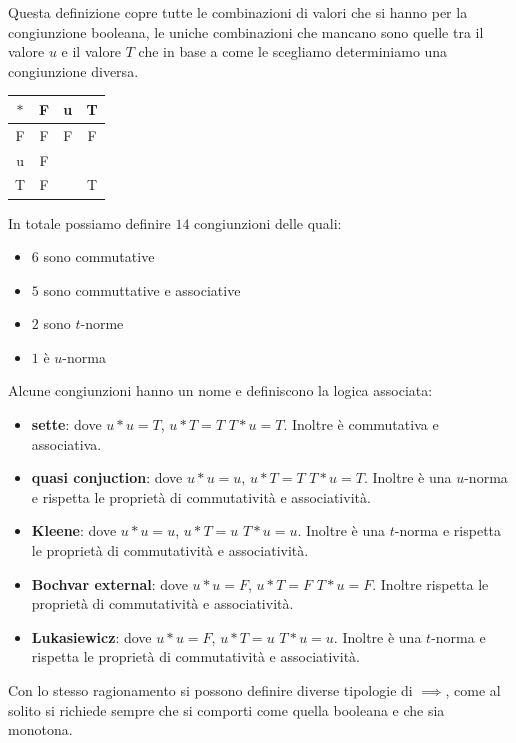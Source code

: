 Questa definizione copre tutte le combinazioni di valori che si hanno per la congiunzione 
booleana, le uniche combinazioni che mancano sono quelle tra il valore $u$ e 
il valore $T$ che in base a come le scegliamo determiniamo una congiunzione diversa.

\begin{table}[!ht]
    \centering
    \begin{tabular}{c|c|c|c}
        $\ast$ & F & u & T \\
        \hline
        F        & F & F & F \\
        u        & F &  &  \\
        T        & F &  & T
    \end{tabular}
\end{table}

In totale possiamo definire $14$ congiunzioni delle quali:
\begin{itemize}
    \item $6$ sono commutative 
    \item $5$ sono commuttative e associative
    \item $2$ sono $t$-norme
    \item $1$ è $u$-norma
\end{itemize}

Alcune congiunzioni hanno un nome e definiscono la logica associata:
\begin{itemize}
    \item \textbf{sette}: dove $u\ast u= T$, $u\ast T = T$ $T\ast u = T$. Inoltre 
    è commutativa e associativa.
    \item \textbf{quasi conjuction}: dove $u\ast u= u$, $u\ast T = T$ $T\ast u = T$. Inoltre 
    è una $u$-norma e rispetta le proprietà di commutatività e associatività.
    \item \textbf{Kleene}: dove $u\ast u= u$, $u\ast T = u$ $T\ast u = u$. Inoltre 
    è una $t$-norma e rispetta le proprietà di commutatività e associatività.
    \item \textbf{Bochvar external}: dove $u\ast u= F$, $u\ast T = F$ $T\ast u = F$.
    Inoltre rispetta le proprietà di commutatività e associatività.
    \item \textbf{Lukasiewicz}: dove $u\ast u= F$, $u\ast T = u$ $T\ast u = u$. Inoltre 
    è una $t$-norma e rispetta le proprietà di commutatività e associatività.
\end{itemize}

Con lo stesso ragionamento si possono definire diverse tipologie di $\implies$,
come al solito si richiede sempre che si comporti come quella booleana e che sia 
monotona.

